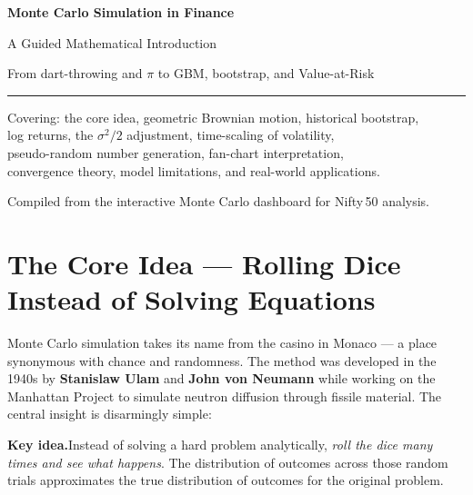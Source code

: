 \documentclass[11pt, a4paper]{article}
\begin{document}
\begin{titlepage}
  \centering
  \vspace*{3cm}
  {\Large\bfseries Monte Carlo Simulation in Finance}\par
  \vspace{0.5cm}
  {\large A Guided Mathematical Introduction}\par
  \vspace{1.5cm}
  {\large From dart-throwing and $\pi$ to GBM, bootstrap, and Value-at-Risk}\par
  \vspace{2cm}
  \textcolor{muted}{\rule{8cm}{0.4pt}}\par
  \vspace{1.2cm}
  {\normalsize
    Covering: the core idea, geometric Brownian motion, historical bootstrap,\\
    log returns, the $\sigma^2/2$ adjustment, time-scaling of volatility,\\
    pseudo-random number generation, fan-chart interpretation,\\
    convergence theory, model limitations, and real-world applications.\par
  }
  \vfill
  {\small\textcolor{muted}{Compiled from the interactive Monte Carlo dashboard for Nifty\,50 analysis.}}
\end{titlepage}

\tableofcontents
\newpage

\section{The Core Idea — Rolling Dice Instead of Solving Equations}
\label{sec:core}

Monte Carlo simulation takes its name from the casino in Monaco — a place synonymous with chance and randomness. The method was developed in the 1940s by \textbf{Stanislaw Ulam} and \textbf{John von Neumann} while working on the Manhattan Project to simulate neutron diffusion through fissile material. The central insight is disarmingly simple:

\begin{tcolorbox}[infobox]
\textbf{Key idea.}\quad Instead of solving a hard problem analytically, \emph{roll the dice many times and see what happens}. The distribution of outcomes across those random trials approximates the true distribution of outcomes for the original problem.
\end{tcolorbox}
\end{document}
